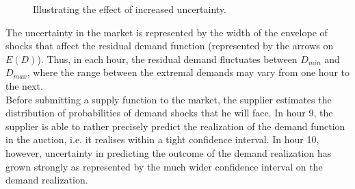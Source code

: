 \begin{figure}[!ht]
\begin{center}  \end{center}
\caption{Illustrating the effect of increased uncertainty.}
\label{predictslope}
\end{figure}

The uncertainty in the market is represented %
 by the width of the envelope of shocks that affect the residual demand function (represented by the arrows on $E(D)$). Thus, in each hour, the residual demand fluctuates between $D_{min}$ and $D_{max}$, where the range between the extremal demands may vary from one hour to the next. \\
 
Before submitting a supply function to the market, the supplier estimates the distribution of probabilities of demand shocks that he will face.  %
In hour 9, the supplier is able to rather precisely predict the realization of the demand function in the auction, i.e. it realises within a tight confidence interval. In hour 10, however, uncertainty in predicting the outcome of the demand realization has grown strongly as represented by the much wider confidence interval on the demand realization. \\

